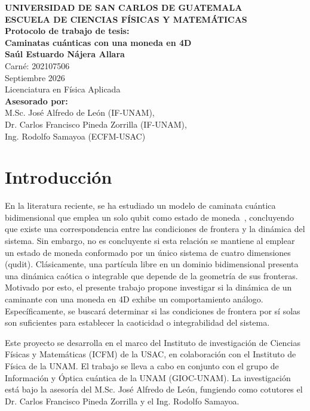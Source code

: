 \documentclass[11pt,a4paper]{article}  %
\begin{document}
\begin{center}
    \Large \textbf{UNIVERSIDAD DE SAN CARLOS DE GUATEMALA} \\
    \textbf{ESCUELA DE CIENCIAS FÍSICAS Y MATEMÁTICAS} \\[1.5cm]
    \Large \textbf{Protocolo de trabajo de tesis:} \\
    \textbf{Caminatas cuánticas con una moneda en 4D} \\[1.5cm]
    \textbf{Saúl Estuardo Nájera Allara} \\
    Carné: 202107506 \\[1cm]
    Septiembre 2026 \\[1cm]
    Licenciatura en Física Aplicada \\[1.5cm]
    \textbf{Asesorado por:} \\
    M.Sc. José Alfredo de León (IF-UNAM), \\
    Dr. Carlos Francisco Pineda Zorrilla (IF-UNAM), \\
    Ing. Rodolfo Samayoa (ECFM-USAC)
\end{center}
\newpage \tableofcontents \newpage
\section{Introducción}  %

En la literatura reciente, se ha estudiado un modelo de caminata cuántica bidimensional que emplea un solo qubit como estado de moneda~\cite{alonso-lobo2025simplest}, 
concluyendo que existe una correspondencia entre las condiciones de frontera y la dinámica del sistema.
Sin embargo, no es concluyente si esta relación se mantiene al emplear un estado de moneda conformado por un único sistema de cuatro dimensiones (qudit).
Clásicamente, una partícula libre en un dominio bidimensional presenta una dinámica caótica o integrable que depende de la geometría de sus fronteras. Motivado por esto, el presente trabajo propone investigar si la dinámica de un caminante con una moneda en 4D exhibe un comportamiento análogo. Específicamente, se buscará determinar si las condiciones de frontera por sí solas son suficientes para establecer la caoticidad o integrabilidad del sistema.

Este proyecto se desarrolla en el marco del Instituto de investigación de Ciencias Físicas y Matemáticas (ICFM) de la USAC, en colaboración con el Instituto de Física de la UNAM. El trabajo se lleva a cabo en conjunto con el grupo de Información y Óptica cuántica de la UNAM (GIOC-UNAM). La investigación está bajo la asesoría del M.Sc. José Alfredo de León, fungiendo como cotutores el Dr. Carlos Francisco Pineda Zorrilla y el Ing. Rodolfo Samayoa.
\end{document}
